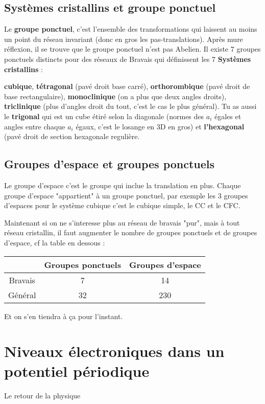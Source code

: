 \documentclass[a4paper]{report}
\begin{document}
  \section{Systèmes cristallins et groupe ponctuel}
  Le \textbf{groupe ponctuel}, c'est l'ensemble des transformations qui laissent au moins un point du réseau invariant (donc en gros les pas-translations). Après mure réflexion, il se trouve que le groupe ponctuel n'est pas Abelien. Il existe 7 groupes ponctuels distincts pour des réseaux de Bravais qui définissent les 7 \textbf{Systèmes cristallins} :
  
   \textbf{cubique}, \textbf{tétragonal} (pavé droit base carré), \textbf{orthorombique} (pavé droit de base rectangulaire), \textbf{monoclinique} (on a plus que deux angles droits), \textbf{triclinique} (plus d'angles droit du tout, c'est le cas le plus général). Tu as aussi le \textbf{trigonal} qui est un cube étiré selon la diagonale (normes des $a_i$ égales et angles entre chaque $a_i$ égaux, c'est le losange en 3D en gros) et \textbf{l'hexagonal} (pavé droit de section hexagonale regulière.
  \section{Groupes d'espace et groupes ponctuels}
  Le groupe d'espace c'est le groupe qui inclue la translation en plus. Chaque groupe d'espace "appartient" à un groupe ponctuel, par exemple les 3 groupes d'espaces pour le système cubique c'est le cubique simple, le CC et le CFC.
  
  Maintenant si on ne s'interesse plus au réseau de bravais "pur", mais à  tout réseau cristallin, il faut augmenter le nombre de groupes ponctuels et de groupes d'espace, cf la table en dessous :
  
  \begin{center}
  \begin{tabular}{ccc}
\hline
 & Groupes ponctuels & Groupes d'espace \\
\hline
Bravais & 7 & 14 \\
Général & 32 & 230 \\
\hline
\end{tabular}
  \end{center}
  
 Et on s'en tiendra à ça pour l'instant.
 \chapter{Niveaux électroniques dans un potentiel périodique}
 Le retour de la physique
\end{document}
